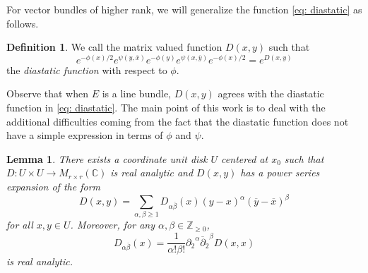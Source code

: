 \documentclass{amsart}
\newtheorem{lem}[thm]{Lemma}
\theoremstyle{definition}
\newtheorem{defn}[thm]{Definition}
\theoremstyle{remark}
\numberwithin{equation}{section}
\begin{document}
For vector bundles of higher rank, we will generalize the function \eqref{eq: diastatic} as follows.  
\begin{defn}
We call the matrix valued function $D(x,y)$ such that
$$
e^{-\phi(x)/2} e^{\psi(y,\overline{x})} e^{-\phi(y)} e^{\psi(x,\overline{y})} e^{-\phi(x)/2} = e^{D(x,y)}
$$
the \emph{diastatic function} with respect to $\phi$.
\end{defn}

Observe that when $E$ is a line bundle, $D(x,y)$ agrees with the diastatic function in \eqref{eq: diastatic}. The main point of this work is to deal with the additional difficulties coming from the fact that the diastatic function does not have a simple expression in terms of $\phi$ and $\psi$.


\begin{lem} \label{lem: diastatic}
There exists a coordinate unit disk $U$ centered at $x_0$ such that $D: U \times U \to M_{r \times r}(\mathbb{C})$ is real analytic and $D(x,y)$ has a power series expansion of the form
$$
D(x,y) = \sum_{\alpha,\beta \geq 1} D_{\alpha \overline{\beta}}(x) (y-x)^\alpha (\overline{y} - \overline{x})^\beta
$$
for all $x,y \in U$. Moreover, for any $\alpha,\beta \in \mathbb{Z}_{\geq 0}$,
$$
D_{\alpha\overline{\beta}}(x) = \frac{1}{\alpha! \beta!} {\partial_2}^\alpha {\overline{\partial}_2}^\beta D(x,x)
$$
is real analytic.
\end{lem}
\end{document}
